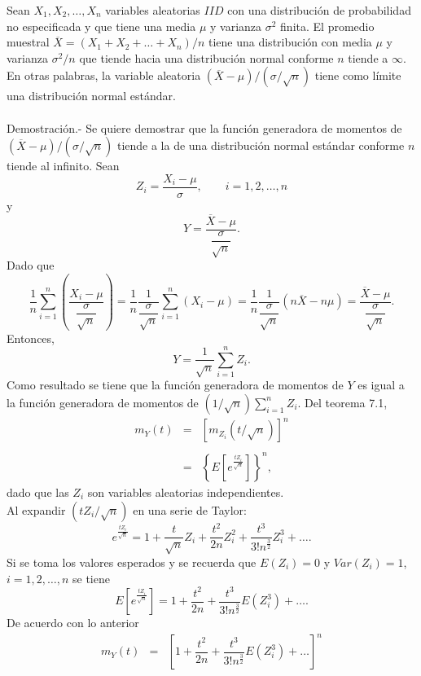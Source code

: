 \begin{teo}
    Sean $X_1,X_2,\ldots , X_n$ variables aleatorias $IID$ con una distribución de probabilidad no especificada y que tiene una media $\mu$ y varianza $\sigma^2$ finita. El promedio muestral $\overline{X}=\left(X_1+X_2+\ldots + X_n\right)/n$ tiene una distribución con media $\mu$ y varianza $\sigma^2/n$ que tiende hacia una distribución normal conforme $n$ tiende a $\infty$. En otras palabras, la variable aleatoria $(\overline{X}-\mu)/(\sigma/\sqrt{n})$ tiene como límite una distribución normal estándar.\\\\
    Demostración.-\; Se quiere demostrar que la función generadora de momentos de $(\overline{X}-\mu)/(\sigma/\sqrt{n})$ tiende a la de una distribución normal estándar conforme $n$ tiende al infinito. Sean
    $$Z_i=\dfrac{X_i-\mu}{\sigma},\qquad i=1,2,\ldots,n$$
    y
    $$Y=\dfrac{\overline{X}-\mu}{\dfrac{\sigma}{\sqrt{n}}}.$$
    Dado que 
    $$\dfrac{1}{n}\sum_{i=1}^n \left(\dfrac{X_i-\mu}{\dfrac{\sigma}{\sqrt{n}}}\right)=\dfrac{1}{n}\dfrac{1}{\dfrac{\sigma}{\sqrt{n}}}\sum_{i=1}^n (X_i-\mu)=\dfrac{1}{n}\dfrac{1}{\dfrac{\sigma}{\sqrt{n}}}(n\overline{X}-n\mu)=\dfrac{\overline{X}-\mu}{\dfrac{\sigma}{\sqrt{n}}}.$$
    Entonces,
    $$Y=\dfrac{1}{\sqrt{n}}\sum_{i=1}^n Z_i.$$
    Como resultado se tiene que la función generadora de momentos de $Y$ es igual a la función generadora de momentos de $(1/\sqrt{n})\sum_{i=1}^n Z_i$. Del teorema 7.1,
    $$
    \begin{array}{rcl}
	m_Y(t)&=&\left[m_{Z_i}(t/\sqrt{n})\right]^n\\\\
	      &=& \left\{E\left[e^{\frac{tZ_i}{\sqrt{n}}}\right]\right\}^n,
    \end{array}
    $$
    dado que las $Z_i$ son variables aleatorias independientes.\\
    Al expandir $(tZ_i/\sqrt{n})$ en una serie de Taylor:
    $$e^{\frac{tZ_i}{\sqrt{n}}}=1+\dfrac{t}{\sqrt{n}}Z_i + \dfrac{t^2}{2n}Z_i^2 + \dfrac{t^3}{3!n^{\frac{3}{2}}}Z_i^3 + \ldots .$$
    Si se toma los valores esperados y se recuerda que $E(Z_i)=0$ y $Var(Z_i)=1$, $i=1,2,\ldots,n$ se tiene
    $$E\left[e^{\frac{tZ_i}{\sqrt{n}}}\right]=1+\dfrac{t^2}{2n}+\dfrac{t^3}{3!n^{\frac{3}{2}}}E\left(Z_i^3\right)+\ldots.$$
    De acuerdo con lo anterior
    $$
    \begin{array}{rcl}
	m_Y(t) &=& \left[1+\dfrac{t^2}{2n}+\dfrac{t^3}{3!n^{\frac{3}{2}}}E\left(Z_i^3\right)+\ldots\right]^n\\\\

\end{array}$$
\end{teo}
